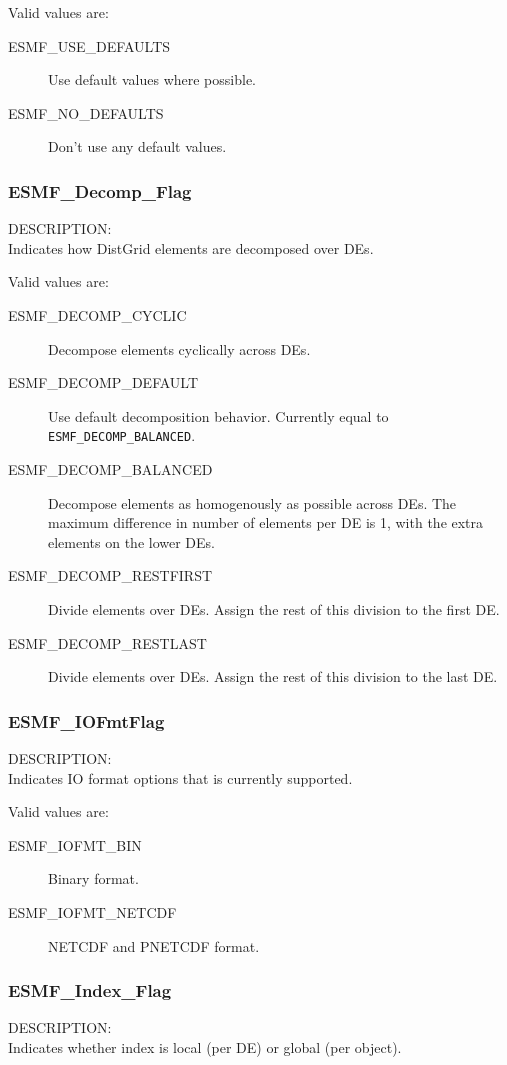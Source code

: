 Valid values are:
\begin{description}
\item [ESMF\_USE\_DEFAULTS]
      Use default values where possible.
\item [ESMF\_NO\_DEFAULTS]
      Don't use any default values.
\end{description}

\subsubsection{ESMF\_Decomp\_Flag}
\label{opt:decompflag}
{\sf DESCRIPTION:\\}
Indicates how DistGrid elements are decomposed over DEs.

Valid values are:
\begin{description}
\item [ESMF\_DECOMP\_CYCLIC]
      Decompose elements cyclically across DEs.
\item [ESMF\_DECOMP\_DEFAULT]
      Use default decomposition behavior. Currently equal to 
      {\tt ESMF\_DECOMP\_BALANCED}.
\item [ESMF\_DECOMP\_BALANCED]
      Decompose elements as homogenously as possible across DEs. The maximum 
      difference in number of elements per DE is 1, with the extra elements on
      the lower DEs.
\item [ESMF\_DECOMP\_RESTFIRST]
      Divide elements over DEs. Assign the rest of this division to the first
      DE.
\item [ESMF\_DECOMP\_RESTLAST]
      Divide elements over DEs. Assign the rest of this division to the last DE.
\end{description}

\subsubsection{ESMF\_IOFmtFlag}
\label{opt:iofmtflag}
{\sf DESCRIPTION:\\}
Indicates IO format options that is currently supported.

Valid values are:
\begin{description}
\item [ESMF\_IOFMT\_BIN]
      Binary format.
\item [ESMF\_IOFMT\_NETCDF]
      NETCDF and PNETCDF format.
\end{description}

\subsubsection{ESMF\_Index\_Flag}
\label{opt:indexflag}
{\sf DESCRIPTION:\\}
Indicates whether index is local (per DE) or global (per object).

